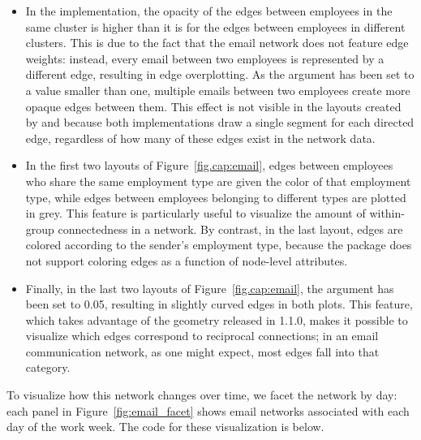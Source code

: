 \begin{itemize}


  \item %
  In the  implementation, the opacity of the edges between employees in the same cluster is higher than it is for the edges between employees in different clusters. This is due to the fact that the email network does not feature edge weights: instead, every email between two employees is represented by a different edge, resulting in edge overplotting. As the  argument has been set to a value smaller than one, multiple emails between two employees create more opaque edges between them. This effect is not visible in the layouts created by  and  because both implementations draw a single segment for each directed edge, regardless of how many of these edges exist in the network data.

  \item %
  In the first two layouts of Figure~\ref{fig.cap:email}, edges between employees who share the same employment type are given the color of that employment type, while edges between employees belonging to different types are plotted in grey. This feature is particularly useful to visualize the amount of within-group connectedness in a network. By contrast, in the last layout, edges are colored according to the sender's employment type, because the  package does not support coloring edges as a function of node-level attributes.

	\item %
	  Finally, in the last two layouts of Figure~\ref{fig.cap:email}, the  argument has been set to 0.05, resulting in slightly curved edges in both plots. This feature, which takes advantage of the  geometry released in  1.1.0, makes it possible to visualize which edges correspond to reciprocal connections; in an email communication network, as one might expect, most edges fall into that category.

\end{itemize}

To visualize how this network  changes over time, we facet the network by day: each panel in Figure~\ref{fig:email_facet} shows email networks associated with each day of the work week. The code for these visualization is below.

